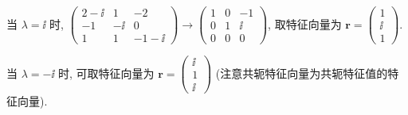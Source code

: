 \begin{solve}
  当 $\lambda=\ii$ 时, $\begin{pmatrix}2-\ii&1&-2\\-1&-\ii&0\\1&1&-1-\ii\end{pmatrix}\to\begin{pmatrix}1&0&-1\\0&1&\ii\\0&0&0\end{pmatrix}$, 
  取特征向量为 $\bm{r}=\begin{pmatrix}1\\\ii\\1\end{pmatrix}$.

  当 $\lambda=-\ii$ 时, 可取特征向量为 $\bm{r}=\begin{pmatrix}\ii\\1\\\ii\end{pmatrix}$
  (注意共轭特征向量为共轭特征值的特征向量).


\end{solve}

